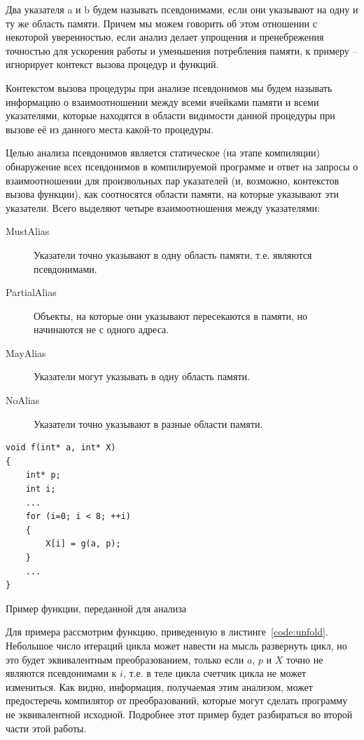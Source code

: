 \begin{mydefinition}
Два указателя a и b будем называть псевдонимами, если они указывают на одну и ту же область памяти. Причем мы можем говорить об этом отношении с некоторой уверенностью, если анализ делает упрощения и пренебрежения точностью для ускорения работы и уменьшения потребления памяти, к примеру -- игнорирует контекст вызова процедур и функций.
\end{mydefinition}

\begin{mydefinition}
Контекстом вызова процедуры при анализе псевдонимов мы будем называть информацию о взаимоотношении между всеми ячейками памяти и всеми указателями, которые находятся в области видимости данной процедуры при вызове её из данного места какой-то процедуры. 
\end{mydefinition}

Целью анализа псевдонимов является статическое (на этапе компиляции) обнаружение всех псевдонимов в компилируемой программе и ответ на запросы о взаимоотношении для произвольных пар указателей (и, возможно, контекстов вызова функции), как соотносятся области памяти, на которые указывают эти указатели. Всего выделяют четыре взаимоотношения между указателями:
\begin{description}
  \item[MustAlias] Указатели точно указывают в одну область памяти, т.е. являются псевдонимами.
  \item[PartialAlias] Объекты, на которые они указывают пересекаются в памяти, но начинаются не с одного адреса.
  \item[MayAlias] Указатели могут указывать в одну область памяти.
  \item[NoAlias] Указатели точно указывают в разные области памяти.
\end{description}

\begin{ListingEnv}[H]
\begin{lstlisting}
void f(int* a, int* X)
{
    int* p;
    int i;
    ...
    for (i=0; i < 8; ++i)
    {
        X[i] = g(a, p);
    }
    ...
}
\end{lstlisting}
\caption{Пример функции, переданной для анализа}
\label{code:unfold}
\end{ListingEnv}

\begin{myexample}
Для примера рассмотрим функцию, приведенную в листинге~\ref{code:unfold}. Небольшое число итераций цикла может навести на мысль развернуть цикл, но это будет эквивалентным преобразованием, только если $a$, $p$ и $X$ точно не являются псевдонимами к $i$, т.е. в теле цикла счетчик цикла не может измениться. Как видно, информация, получаемая этим анализом, может предостеречь компилятор от преобразований, которые могут сделать программу не эквивалентной исходной. Подробнее этот пример будет разбираться во второй части этой работы.
\label{ex:unfold}
\end{myexample}

